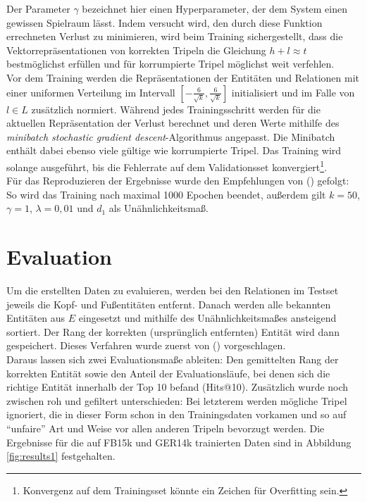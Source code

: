 Der Parameter $\gamma$ bezeichnet hier einen Hyperparameter, der dem System einen gewissen Spielraum lässt. Indem versucht
wird, den durch diese Funktion errechneten Verlust zu minimieren, wird beim Training sichergestellt, dass die Vektorrepräsentationen
von korrekten Tripeln die Gleichung $h + l \approx t$ bestmöglichst erfüllen und für korrumpierte Tripel möglichst weit
verfehlen.\\
Vor dem Training werden die Repräsentationen der Entitäten und Relationen mit einer uniformen Verteilung im Intervall
$[-\frac{6}{\sqrt{k}}, \frac{6}{\sqrt{k}}]$ initialisiert und im Falle von $l \in L$ zusätzlich normiert. Während jedes
Trainingsschritt werden für die aktuellen Repräsentation der Verlust berechnet und deren Werte mithilfe des
\emph{minibatch stochastic gradient descent}-Algorithmus angepasst. Die Minibatch enthält dabei ebenso viele gültige wie korrumpierte Tripel.
Das Training wird solange ausgeführt, bis die Fehlerrate auf dem Validationsset konvergiert\footnote{Konvergenz auf dem
Trainingsset könnte ein Zeichen für Overfitting sein.}.\\

Für das Reproduzieren der Ergebnisse wurde den Empfehlungen von (\cite{bordes2013translating}) gefolgt: So wird das Training
nach maximal 1000 Epochen beendet, außerdem gilt $k = 50$, $\gamma = 1$, $\lambda = 0,01$ und $d_1$ als Unähnlichkeitsmaß.

\section{Evaluation}\label{sec:transe-eval}

Um die erstellten Daten zu evaluieren, werden bei den Relationen im Testset jeweils die Kopf- und Fußentitäten entfernt.
Danach werden alle bekannten Entitäten aus $E$ eingesetzt und mithilfe des Unähnlichkeitsmaßes ansteigend sortiert. Der Rang
der korrekten (ursprünglich entfernten) Entität wird dann gespeichert. Dieses Verfahren wurde zuerst von (\cite{bordes2011learning})
vorgeschlagen.\\
Daraus lassen sich zwei Evaluationsmaße ableiten: Den gemittelten Rang der korrekten Entität sowie den Anteil
der Evaluationsläufe, bei denen sich die richtige Entität innerhalb der Top 10 befand (Hits@10). Zusätzlich wurde noch
zwischen roh und gefiltert unterschieden: Bei letzterem werden mögliche Tripel ignoriert, die in dieser Form schon in
den Trainingsdaten vorkamen und so auf ``unfaire'' Art und Weise vor allen anderen Tripeln bevorzugt werden.
Die Ergebnisse für die auf FB15k und GER14k trainierten Daten sind in Abbildung \ref{fig:results1} festgehalten.

